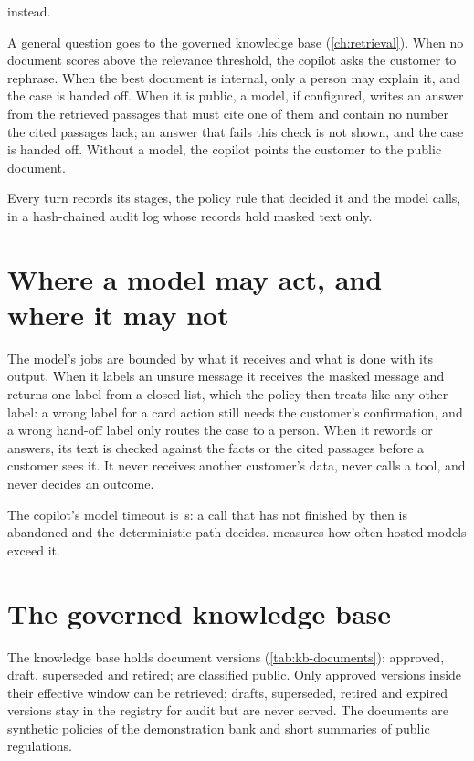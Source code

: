 \begin{description}[style=nextline]
  instead.
  \item[Knowledge.] A general question goes to the governed knowledge base (\cref{ch:retrieval}). When no
  document scores above the relevance threshold, the copilot asks the customer to rephrase. When the best document
  is internal, only a person may explain it, and the case is handed off. When it is public, a model, if configured,
  writes an answer from the retrieved passages that must cite one of them and contain no number the cited passages
  lack; an answer that fails this check is not shown, and the case is handed off. Without a model, the copilot points
  the customer to the public document.
  \item[Trace and audit.] Every turn records its stages, the policy rule that decided it and the model calls, in a
  hash-chained audit log whose records hold masked text only.
\end{description}

\section{Where a model may act, and where it may not}

The model's jobs are bounded by what it receives and what is done with its output. When it labels an unsure
message it receives the masked message and returns one label from a closed list, which the policy then treats like
any other label: a wrong label for a card action still needs the customer's confirmation, and a wrong hand-off label
only routes the case to a person. When it rewords or answers, its text is checked against the facts or the cited
passages before a customer sees it. It never receives another customer's data, never calls a tool, and never decides
an outcome.

The copilot's model timeout is \,s: a call that has not finished by then is abandoned
and the deterministic path decides.  measures how often hosted models exceed it.

\section{The governed knowledge base}

The knowledge base holds  document versions (\cref{tab:kb-documents}):
 approved,  draft,  superseded
and  retired;  are classified public. Only approved versions
inside their effective window can be retrieved; drafts, superseded, retired and expired versions stay in the
registry for audit but are never served. The documents are synthetic policies of the demonstration bank and short
summaries of public regulations.

